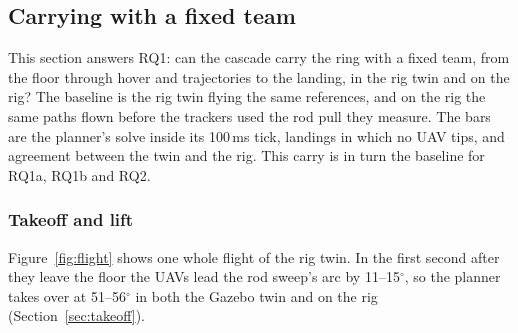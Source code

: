 
\subsection{Carrying with a fixed team}
\label{sec:res_carry}

This section answers RQ1: can the cascade carry the ring with a fixed team, from the floor through hover
and trajectories to the landing, in the rig twin and on the rig? The baseline is the rig twin flying the
same references, and on the rig the same paths flown before the trackers used the rod pull they measure.
The bars are the planner's solve inside its 100\,ms tick, landings in which no UAV tips, and agreement
between the twin and the rig. This carry is in turn the baseline for RQ1a, RQ1b and RQ2.

\subsubsection{Takeoff and lift}

Figure~\ref{fig:flight} shows one whole flight of the rig twin. In the first second after they leave
the floor the UAVs lead the rod sweep's arc by 11--15$^\circ$, so the planner takes over at
51--56$^\circ$ in both the Gazebo twin and on the rig (Section~\ref{sec:takeoff}).

